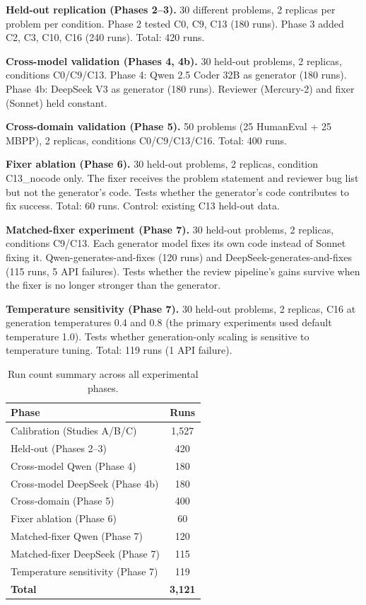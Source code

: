 \documentclass{article}
\begin{document}
\textbf{Held-out replication (Phases 2--3).} 30 different problems, 2 replicas per problem per condition. Phase 2 tested C0, C9, C13 (180 runs). Phase 3 added C2, C3, C10, C16 (240 runs). Total: 420 runs.

\textbf{Cross-model validation (Phases 4, 4b).} 30 held-out problems, 2 replicas, conditions C0/C9/C13. Phase 4: Qwen 2.5 Coder 32B as generator (180 runs). Phase 4b: DeepSeek V3 as generator (180 runs). Reviewer (Mercury-2) and fixer (Sonnet) held constant.

\textbf{Cross-domain validation (Phase 5).} 50 problems (25 HumanEval + 25 MBPP), 2 replicas, conditions C0/C9/C13/C16. Total: 400 runs.

\textbf{Fixer ablation (Phase 6).} 30 held-out problems, 2 replicas, condition C13\_nocode only. The fixer receives the problem statement and reviewer bug list but not the generator's code. Tests whether the generator's code contributes to fix success. Total: 60 runs. Control: existing C13 held-out data.

\textbf{Matched-fixer experiment (Phase 7).} 30 held-out problems, 2 replicas, conditions C9/C13. Each generator model fixes its own code instead of Sonnet fixing it. Qwen-generates-and-fixes (120 runs) and DeepSeek-generates-and-fixes (115 runs, 5 API failures). Tests whether the review pipeline's gains survive when the fixer is no longer stronger than the generator.

\textbf{Temperature sensitivity (Phase 7).} 30 held-out problems, 2 replicas, C16 at generation temperatures 0.4 and 0.8 (the primary experiments used default temperature 1.0). Tests whether generation-only scaling is sensitive to temperature tuning. Total: 119 runs (1 API failure).

\begin{table}[t]
\centering
\caption{Run count summary across all experimental phases.}
\label{tab:runcounts}
\small
\begin{tabular}{lc}
\toprule
Phase & Runs \\
\midrule
Calibration (Studies A/B/C) & 1,527 \\
Held-out (Phases 2--3) & 420 \\
Cross-model Qwen (Phase 4) & 180 \\
Cross-model DeepSeek (Phase 4b) & 180 \\
Cross-domain (Phase 5) & 400 \\
Fixer ablation (Phase 6) & 60 \\
Matched-fixer Qwen (Phase 7) & 120 \\
Matched-fixer DeepSeek (Phase 7) & 115 \\
Temperature sensitivity (Phase 7) & 119 \\
\midrule
\textbf{Total} & \textbf{3,121} \\
\bottomrule
\end{tabular}
\end{table}
\end{document}
